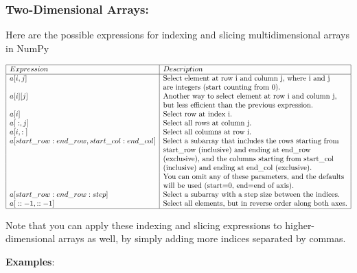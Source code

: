 \documentclass[11pt]{article}
\begin{document}
\hypertarget{two-dimensional-arrays}{%
\subsubsection{Two-Dimensional Arrays:}\label{two-dimensional-arrays}}

Here are the possible expressions for indexing and slicing
multidimensional arrays in NumPy

$$\begin{array}{|l|l|}
\hline
Expression& Description\\
\hline
a{[}i, j{]} &\text{Select element at row i and column j, where i and j}\\ 
& \text{are integers (start counting from 0).} \\
a{[}i{]}{[}j{]} &\text{Another way to select element at row i and column j,}\\ 
& \text{but less efficient than the previous expression.} \\
a{[}i{]} &\text{Select row at index i.} \\
a{[}:, j{]} &\text{Select all rows at column j.} \\
a{[}i, :{]} &\text{Select all columns at row i.} \\
a{[}start\_row:end\_row, start\_col:end\_col{]} &\text{Select a subarray that
includes the rows starting from}\\ 
& \text{start\_row (inclusive) and ending at
end\_row}\\ 
& \text{(exclusive), and the columns starting from start\_col
}\\ 
& \text{(inclusive) and ending at end\_col (exclusive).}\\ 
& \text{You can omit any of
these parameters, and the defaults}\\ 
& \text{will be used (start=0, end=end of
axis).} \\
a{[}start\_row:end\_row:step{]} &\text{Select a
subarray with a step size between the indices.} \\
a{[}::-1, ::-1{]} &\text{Select all elements, but in reverse order along both
axes.} \\
\hline
\end{array}$$

Note that you can apply these indexing and slicing expressions to
higher-dimensional arrays as well, by simply adding more indices
separated by commas.

\textbf{Examples}:
\end{document}
